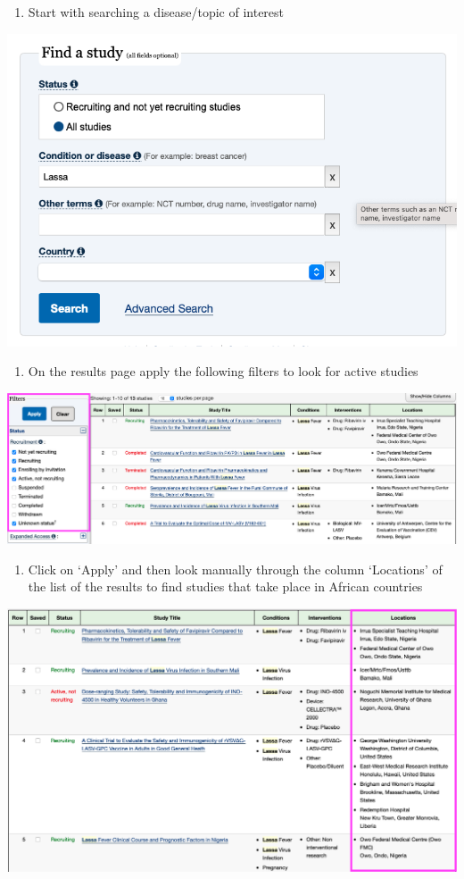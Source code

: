 \documentclass[
]{book}
\providecommand{\tightlist}{%
  \setlength{\itemsep}{0pt}\setlength{\parskip}{0pt}}
\begin{document}
\begin{enumerate}
\def\labelenumi{\arabic{enumi}.}
\tightlist
\item
  Start with searching a disease/topic of interest
\end{enumerate}

\includegraphics{images/clinicaltrial1.png}

\begin{enumerate}
\def\labelenumi{\arabic{enumi}.}
\setcounter{enumi}{1}
\tightlist
\item
  On the results page apply the following filters to look for active studies
\end{enumerate}

\includegraphics{images/clinicaltrial2.png}

\begin{enumerate}
\def\labelenumi{\arabic{enumi}.}
\setcounter{enumi}{2}
\tightlist
\item
  Click on `Apply' and then look manually through the column `Locations' of the list of the results to find studies that take place in African countries
\end{enumerate}

\includegraphics{images/clinicaltrial3.png}
\end{document}
